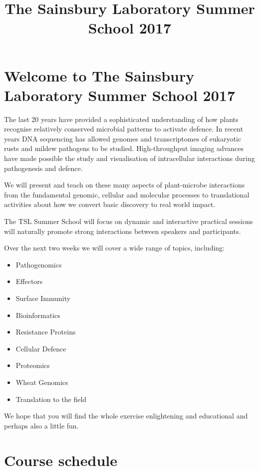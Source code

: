 \documentclass[12pt,]{book}
\title{The Sainsbury Laboratory Summer School 2017}
\author{}
\date{}
\providecommand{\tightlist}{%
  \setlength{\itemsep}{0pt}\setlength{\parskip}{0pt}}
\begin{document}
\maketitle

{
\setcounter{tocdepth}{1}
\tableofcontents
}
\chapter*{Welcome to The Sainsbury Laboratory Summer School
2017}\label{welcome-to-the-sainsbury-laboratory-summer-school-2017}

The last 20 years have provided a sophisticated understanding of how
plants recognise relatively conserved microbial patterns to activate
defence. In recent years DNA sequencing has allowed genomes and
transcriptomes of eukaryotic rusts and mildew pathogens to be studied.
High-throughput imaging advances have made possible the study and
visualisation of intracellular interactions during pathogenesis and
defence.

We will present and teach on these many aspects of plant-microbe
interactions from the fundamental genomic, cellular and molecular
processes to translational activities about how we convert basic
discovery to real world impact.

The TSL Summer School will focus on dynamic and interactive practical
sessions will naturally promote strong interactions between speakers and
participants.

Over the next two weeks we will cover a wide range of topics, including:

\begin{itemize}
\tightlist
\item
  Pathogenomics
\item
  Effectors
\item
  Surface Immunity
\item
  Bioinformatics
\item
  Resistance Proteins
\item
  Cellular Defence
\item
  Proteomics
\item
  Wheat Genomics
\item
  Translation to the field
\end{itemize}

We hope that you will find the whole exercise enlightening and
educational and perhaps also a little fun.

\chapter*{Course schedule}\label{course-schedule}
\end{document}
